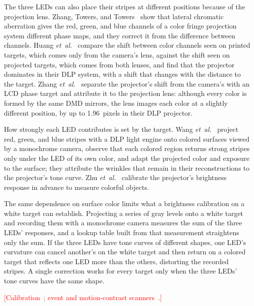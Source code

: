 \documentclass[10pt,journal,compsoc]{IEEEtran}
\newcommand{\pending}[1]{\textcolor{red}{[#1]}}
\begin{document}
The three LEDs can also place their stripes at different positions because of the projection
lens. Zhang, Towers, and Towers~\cite{zhang2010lateral} show that lateral chromatic aberration
gives the red, green, and blue channels of a color fringe projection system different phase maps,
and they correct it from the difference between channels. Huang
\emph{et~al.}~\cite{huang2016lateral} compare the shift between color channels seen on printed
targets, which comes only from the camera's lens, against the shift seen on projected targets,
which comes from both lenses, and find that the projector dominates in their DLP system, with a
shift that changes with the distance to the target. Zhang \emph{et~al.}~\cite{zhang2022chromatic}
separate the projector's shift from the camera's with an LCD phase target and attribute it to the
projection lens: although every color is formed by the same DMD mirrors, the lens images each
color at a slightly different position, by up to 1.96~pixels in their DLP projector.

How strongly each LED contributes is set by the target. Wang
\emph{et~al.}~\cite{wang2021nonuniform} project red, green, and blue stripes with a DLP light
engine onto colored surfaces viewed by a monochrome camera, observe that each colored region
returns strong stripes only under the LED of its own color, and adapt the projected color and
exposure to the surface; they attribute the wrinkles that remain in their reconstructions to the
projector's tone curve. Zhu \emph{et~al.}~\cite{zhu2022colorful} calibrate the projector's
brightness response in advance to measure colorful objects.

The same dependence on surface color limits what a brightness calibration on a white target can
establish. Projecting a series of gray levels onto a white target and recording them with a
monochrome camera measures the sum of the three LEDs' responses, and a lookup table built from
that measurement straightens only the sum. If the three LEDs have tone curves of different
shapes, one LED's curvature can cancel another's on the white target and then return on a colored
target that reflects one LED more than the others, distorting the recorded stripes. A single
correction works for every target only when the three LEDs' tone curves have the same shape.

\pending{Calibration~\cite{moreno2012calibration}; event and motion-contrast
scanners~\cite{matsuda2015mc3d}.}

\end{document}
